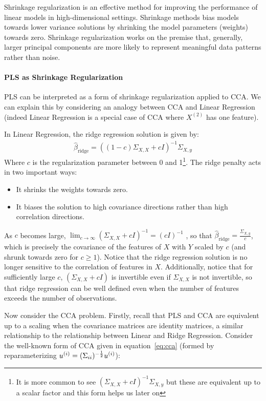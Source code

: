 Shrinkage regularization is an effective method for improving the performance of linear models in high-dimensional settings.
Shrinkage methods bias models towards lower variance solutions by shrinking the model parameters (weights) towards zero.
Shrinkage regularization works on the premise that, generally, larger principal components are more likely to represent meaningful data patterns rather than noise.

\paragraph{PLS as Shrinkage Regularization}

PLS can be interpreted as a form of shrinkage regularization applied to CCA. We can explain this by considering an analogy between CCA and Linear Regression (indeed Linear Regression is a special case of CCA where \(X^{(2)}\) has one feature).

In Linear Regression, the ridge regression solution is given by:
\begin{align}
    \hat{\beta}_{\text{ridge}} = ((1-c)\Sigma_{X,X} + c I)^{-1} \Sigma_{X,y}
\end{align}
Where \(c\) is the regularization parameter between 0 and 1\footnote{It is more common to see $(\Sigma_{X,X} + c I)^{-1} \Sigma_{X,y}$ but these are equivalent up to a scalar factor and this form helps us later on}.
The ridge penalty acts in two important ways:
\begin{itemize}
    \item It shrinks the \gls{weights} towards zero.
    \item It biases the solution to high covariance directions rather than high correlation directions.
\end{itemize}

As $c$ becomes large, $\lim_{c \to \infty} (\Sigma_{X,X} + c I)^{-1} = (c I)^{-1}$
, so that $\hat{\beta}_{\text{ridge}}=\frac{\Sigma_{X,y}}{c}$, which is precisely the covariance of the features of $X$ with $Y$ scaled by $c$ (and shrunk towards zero for $c \geq 1$).
Notice that the ridge regression solution is no longer sensitive to the correlation of features in $X$.
Additionally, notice that for sufficiently large $c$, $(\Sigma_{X,X} + c I)$ is invertible even if $\Sigma_{X,X}$ is not invertible, so that ridge regression can be well defined even when the number of features exceeds the number of observations.

Now consider the CCA problem.
Firstly, recall that PLS and CCA are equivalent up to a scaling when the covariance matrices are identity matrices, a similar relationship to the relationship between Linear and Ridge Regression.
Consider the well-known form of CCA given in equation~\ref{eq:cca}\citep{mihalik2022canonical} (formed by reparameterizing \(u^{(i)}=(\Sigma_{ii})^{-\frac{1}{2}}u^{(i)}\)):

